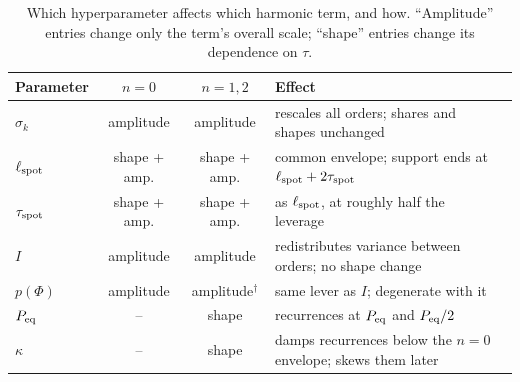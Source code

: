 \documentclass[preprint]{aastex702}
\begin{document}
\begin{table}[ht!]
    \centering
    \caption{Which hyperparameter affects which harmonic term, and how. ``Amplitude'' entries change only the term's overall scale; ``shape'' entries change its dependence on $\tau$.}
    \label{tab:harmonic_matrix}
    \begin{tabular}{lccll}
        \hline
        Parameter & $n = 0$ & $n = 1,2$ & Effect \\
        \hline
        $\sigma_k$ & amplitude & amplitude & rescales all orders; shares and shapes unchanged \\
        $\ell_{\rm spot}$ & shape + amp. & shape + amp. & common envelope; support ends at $\ell_{\rm spot} + 2\tau_{\rm spot}$ \\
        $\tau_{\rm spot}$ & shape + amp. & shape + amp. & as $\ell_{\rm spot}$, at roughly half the leverage \\
        $I$ & amplitude & amplitude & redistributes variance between orders; no shape change \\
        $p(\Phi)$ & amplitude & amplitude$^{\dagger}$ & same lever as $I$; degenerate with it \\
        $P_{\rm eq}$ & -- & shape & recurrences at $P_{\rm eq}$ and $P_{\rm eq}/2$ \\
        $\kappa$ & -- & shape & damps recurrences below the $n = 0$ envelope; skews them later \\
        \hline
    \end{tabular}
\end{table}
\end{document}
